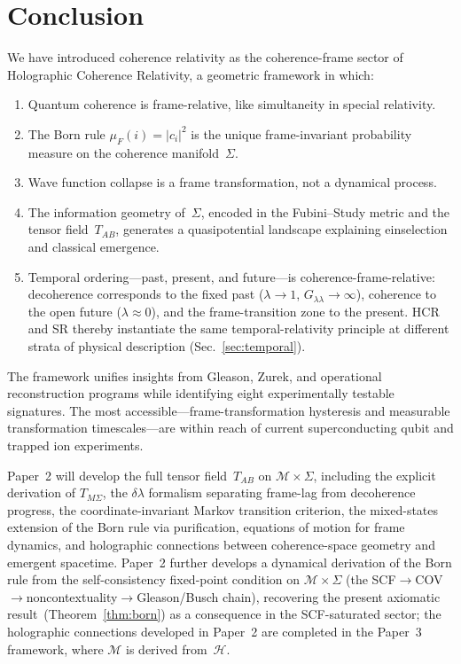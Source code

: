 \documentclass[aps,prd,twocolumn,superscriptaddress,nofootinbib,floatfix]{revtex4-2}
\newcommand{\Sig}{\Sigma}
\newcommand{\Tab}{T_{AB}}
\newcommand{\Gll}{G_{\lambda\lambda}}
\newcommand{\HCRname}{Holographic Coherence Relativity}
\newcommand{\HCR}{HCR}
\newcommand{\CR}{\HCR}  %
\begin{document}
\section{Conclusion}\label{sec:conclusion}

We have introduced coherence relativity as the coherence-frame sector of \HCRname{}, a geometric framework in which:
\begin{enumerate}
\item Quantum coherence is frame-relative, like simultaneity in special relativity.
\item The Born rule $\mu_F(i) = |c_i|^2$ is the unique frame-invariant probability measure on the coherence manifold~$\Sig$.
\item Wave function collapse is a frame transformation, not a dynamical process.
\item The information geometry of~$\Sig$, encoded in the Fubini--Study metric and the tensor field~$\Tab$, generates a quasipotential landscape explaining einselection and classical emergence.
\item Temporal ordering---past, present, and future---is coherence-frame-relative: decoherence corresponds to the fixed past ($\lambda\to 1$, $\Gll\to\infty$), coherence to the open future ($\lambda\approx 0$), and the frame-transition zone to the present. \CR{} and SR thereby instantiate the same temporal-relativity principle at different strata of physical description (Sec.~\ref{sec:temporal}).
\end{enumerate}

The framework unifies insights from Gleason, Zurek, and operational reconstruction programs while identifying eight experimentally testable signatures. The most accessible---frame-transformation hysteresis and measurable transformation timescales---are within reach of current superconducting qubit and trapped ion experiments.

Paper~2 will develop the full tensor field~$\Tab$ on $\mathcal{M} \times \Sig$, including the explicit derivation of $T_{M\Sigma}$, the $\delta\lambda$ formalism separating frame-lag from decoherence progress, the coordinate-invariant Markov transition criterion, the mixed-states extension of the Born rule via purification, equations of motion for frame dynamics, and holographic connections between coherence-space geometry and emergent spacetime. Paper~2 further develops a dynamical derivation of the Born rule from the self-consistency fixed-point condition on $\mathcal{M} \times \Sig$ (the SCF$\to$COV$\to$noncontextuality$\to$Gleason/Busch chain), recovering the present axiomatic result~(Theorem~\ref{thm:born}) as a consequence in the SCF-saturated sector; the holographic connections developed in Paper~2 are completed in the Paper~3 framework, where $\mathcal{M}$ is derived from~$\mathcal{H}$.
\end{document}
